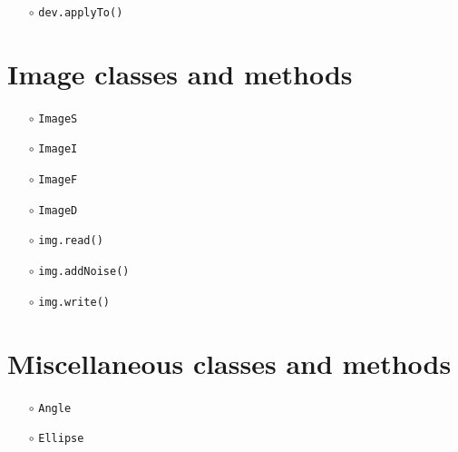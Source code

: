 \documentclass[preprint,11pt]{aastex}
\begin{document}
\begin{itemize}

\item[$\circ$] \texttt{dev.applyTo()}

\end{itemize}

\section{Image classes and methods}\label{sect:image}

\begin{itemize}

\item[$\circ$] \texttt{ImageS}

\item[$\circ$] \texttt{ImageI}

\item[$\circ$] \texttt{ImageF}

\item[$\circ$] \texttt{ImageD}

\end{itemize}


\begin{itemize}

\item[$\circ$] \texttt{img.read()}

\item[$\circ$] \texttt{img.addNoise()}

\item[$\circ$] \texttt{img.write()}

\end{itemize}

\section{Miscellaneous classes and methods}\label{sect:misc}

\begin{itemize}

\item[$\circ$] \texttt{Angle}

\item[$\circ$] \texttt{Ellipse}

\end{itemize}
\end{document}
